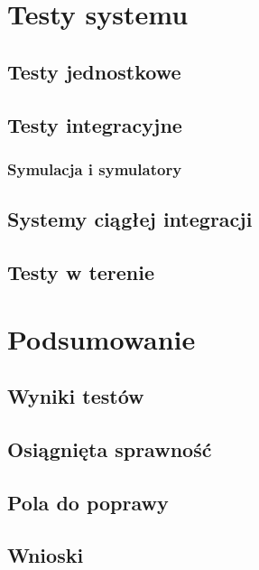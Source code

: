 \chapter{Testy systemu}

\section{Testy jednostkowe}
\section{Testy integracyjne}
\subsection{Symulacja i symulatory}
\section{Systemy ciągłej integracji}
\section{Testy w terenie}

\chapter{Podsumowanie}

\section{Wyniki testów}
\section{Osiągnięta sprawność}
\section{Pola do poprawy}
\section{Wnioski}

